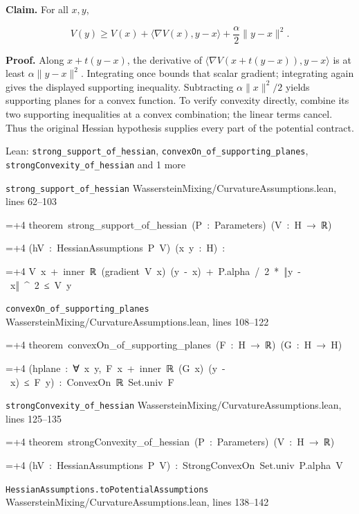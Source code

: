 \documentclass[11pt,a4paper]{article}
\newlength{\leancharwidth}
\newenvironment{leancode}{\par\smallskip\begingroup\ttfamily\footnotesize\raggedright
  \settowidth{\leancharwidth}{M}\setlength{\parskip}{0pt}\setlength{\parindent}{0pt}
  \frenchspacing}{\par\endgroup\smallskip}
\newcommand{\leanline}[2]{\hangindent=\dimexpr#1\leancharwidth+4\leancharwidth\relax
  \hangafter=1\noindent\hspace*{#1\leancharwidth}#2\par}
\newcommand{\leansource}[1]{\par{\footnotesize\color{leanmuted}#1}\par}
\begin{document}
\textbf{Claim.} For all \(x,y\),

\[V(y)\ge V(x)+\langle\nabla V(x),y-x\rangle+\frac\alpha2\|y-x\|^2.\]

\textbf{Proof.} Along \(x+t(y-x)\), the derivative of \(\langle\nabla V(x+t(y-x)),y-x\rangle\) is at least \(\alpha\|y-x\|^2\). Integrating once bounds that scalar gradient; integrating again gives the displayed supporting inequality. Subtracting \(\alpha\|x\|^2/2\) yields supporting planes for a convex function. To verify convexity directly, combine its two supporting inequalities at a convex combination; the linear terms cancel. Thus the original Hessian hypothesis supplies every part of the potential contract.

\begin{leanbox}{Lean: \texttt{strong\_\allowbreak{}support\_\allowbreak{}of\_\allowbreak{}hessian}, \texttt{convexOn\_\allowbreak{}of\_\allowbreak{}supporting\_\allowbreak{}planes}, \texttt{strongConvexity\_\allowbreak{}of\_\allowbreak{}hessian} and 1 more}
\leansource{\texttt{strong\_\allowbreak{}support\_\allowbreak{}of\_\allowbreak{}hessian} \quad WassersteinMixing/\allowbreak{}CurvatureAssumptions.lean, lines 62–103}
\begin{leancode}
\leanline{0}{theorem\ strong\_support\_of\_hessian\ (P\ :\ Parameters)\ (V\ :\ H\ →\ ℝ)}
\leanline{4}{(hV\ :\ HessianAssumptions\ P\ V)\ (x\ y\ :\ H)\ :}
\leanline{4}{V\ x\ +\ inner\ ℝ\ (gradient\ V\ x)\ (y\ -\ x)\ +\ P.alpha\ /\ 2\ *\ ‖y\ -\ x‖\ \textasciicircum{}\ 2\ ≤\ V\ y}
\end{leancode}
\leansource{\texttt{convexOn\_\allowbreak{}of\_\allowbreak{}supporting\_\allowbreak{}planes} \quad WassersteinMixing/\allowbreak{}CurvatureAssumptions.lean, lines 108–122}
\begin{leancode}
\leanline{0}{theorem\ convexOn\_of\_supporting\_planes\ (F\ :\ H\ →\ ℝ)\ (G\ :\ H\ →\ H)}
\leanline{4}{(hplane\ :\ ∀\ x\ y,\ F\ x\ +\ inner\ ℝ\ (G\ x)\ (y\ -\ x)\ ≤\ F\ y)\ :\ ConvexOn\ ℝ\ Set.univ\ F}
\end{leancode}
\leansource{\texttt{strongConvexity\_\allowbreak{}of\_\allowbreak{}hessian} \quad WassersteinMixing/\allowbreak{}CurvatureAssumptions.lean, lines 125–135}
\begin{leancode}
\leanline{0}{theorem\ strongConvexity\_of\_hessian\ (P\ :\ Parameters)\ (V\ :\ H\ →\ ℝ)}
\leanline{4}{(hV\ :\ HessianAssumptions\ P\ V)\ :\ StrongConvexOn\ Set.univ\ P.alpha\ V}
\end{leancode}
\leansource{\texttt{HessianAssumptions.\allowbreak{}toPotentialAssumptions} \quad WassersteinMixing/\allowbreak{}CurvatureAssumptions.lean, lines 138–142}

\end{leanbox}
\end{document}
